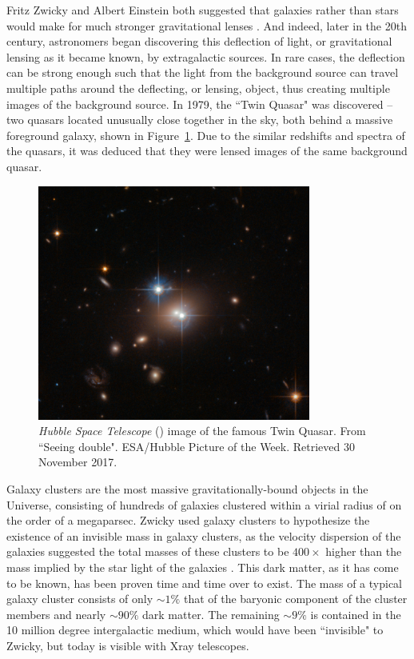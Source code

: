 Fritz Zwicky and Albert Einstein both suggested that galaxies rather than stars would make for much stronger gravitational lenses \citep{Zwicky:1937yq,Einstein:1936cl}. And indeed, later in the 20th century, astronomers began discovering this deflection of light, or gravitational lensing as it became known, by extragalactic sources. In rare cases, the deflection can be strong enough such that the light from the background source can travel multiple paths around the deflecting, or lensing, object, thus creating multiple images of the background source. In 1979, the ``Twin Quasar" was discovered -- two quasars located unusually close together in the sky, both behind a massive foreground galaxy, shown in Figure~\ref{intro:fig:quasar}. Due to the similar redshifts and spectra of the quasars, it was deduced that they were lensed images of the same background quasar.

\begin{figure}
\centering
\includegraphics[width=0.8\textwidth]{Intro/twin_quasar.png}
\caption[\hst\ image of the Twin Quasar]{{\it Hubble Space Telescope} (\hst) image of the famous Twin Quasar. From  ``Seeing double". ESA/Hubble Picture of the Week. Retrieved 30 November 2017.}
\label{intro:fig:quasar}
\end{figure}

Galaxy clusters are the most massive gravitationally-bound objects in the Universe, consisting of hundreds of galaxies clustered within a virial radius of on the order of a megaparsec. Zwicky used galaxy clusters to hypothesize the existence of an invisible mass in galaxy clusters, as the velocity dispersion of the galaxies suggested the total masses of these clusters to be $400\times$ higher than the mass implied by the star light of the galaxies \citep{Zwicky:1937yq}. This dark matter, as it has come to be known, has been proven time and time over to exist. The mass of a typical galaxy cluster consists of only $\sim1\%$ that of the baryonic component of the cluster members and nearly $\sim90\%$ dark matter. The remaining $\sim9\%$ is contained in the 10 million degree intergalactic medium, which would have been ``invisible" to Zwicky, but today is visible with Xray telescopes.

